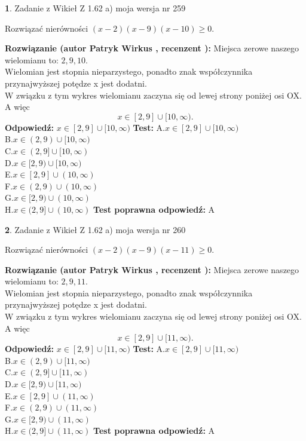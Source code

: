 \documentclass[12pt, a4paper]{article}
\theoremstyle{definition} %
\newtheorem{zad}{}
\newcommand{\zadStart}[1]{\begin{zad}#1\newline}
\newcommand{\zadStop}{\end{zad}}
\newcommand{\rozwStart}[2]{\noindent \textbf{Rozwiązanie (autor #1 , recenzent #2): }\newline}
\newcommand{\rozwStop}{\newline}
\newcommand{\odpStart}{\noindent \textbf{Odpowiedź:}\newline}
\newcommand{\odpStop}{\newline}
\newcommand{\testStart}{\noindent \textbf{Test:}\newline}
\newcommand{\testStop}{\newline}
\newcommand{\kluczStart}{\noindent \textbf{Test poprawna odpowiedź:}\newline}
\newcommand{\kluczStop}{\newline}
\begin{document}
\zadStart{Zadanie z Wikieł Z 1.62 a) moja wersja nr 259}

Rozwiązać nierówności $(x-2)(x-9)(x-10)\ge0$.
\zadStop
\rozwStart{Patryk Wirkus}{}
Miejsca zerowe naszego wielomianu to: $2, 9, 10$.\\
Wielomian jest stopnia nieparzystego, ponadto znak współczynnika przy\linebreak najwyższej potędze x jest dodatni.\\ W związku z tym wykres wielomianu zaczyna się od lewej strony poniżej osi OX. A więc $$x \in [2,9] \cup [10,\infty).$$
\rozwStop
\odpStart
$x \in [2,9] \cup [10,\infty)$
\odpStop
\testStart
A.$x \in [2,9] \cup [10,\infty)$\\
B.$x \in (2,9) \cup [10,\infty)$\\
C.$x \in (2,9] \cup [10,\infty)$\\
D.$x \in [2,9) \cup [10,\infty)$\\
E.$x \in [2,9] \cup (10,\infty)$\\
F.$x \in (2,9) \cup (10,\infty)$\\
G.$x \in [2,9) \cup (10,\infty)$\\
H.$x \in (2,9] \cup (10,\infty)$
\testStop
\kluczStart
A
\kluczStop



\zadStart{Zadanie z Wikieł Z 1.62 a) moja wersja nr 260}

Rozwiązać nierówności $(x-2)(x-9)(x-11)\ge0$.
\zadStop
\rozwStart{Patryk Wirkus}{}
Miejsca zerowe naszego wielomianu to: $2, 9, 11$.\\
Wielomian jest stopnia nieparzystego, ponadto znak współczynnika przy\linebreak najwyższej potędze x jest dodatni.\\ W związku z tym wykres wielomianu zaczyna się od lewej strony poniżej osi OX. A więc $$x \in [2,9] \cup [11,\infty).$$
\rozwStop
\odpStart
$x \in [2,9] \cup [11,\infty)$
\odpStop
\testStart
A.$x \in [2,9] \cup [11,\infty)$\\
B.$x \in (2,9) \cup [11,\infty)$\\
C.$x \in (2,9] \cup [11,\infty)$\\
D.$x \in [2,9) \cup [11,\infty)$\\
E.$x \in [2,9] \cup (11,\infty)$\\
F.$x \in (2,9) \cup (11,\infty)$\\
G.$x \in [2,9) \cup (11,\infty)$\\
H.$x \in (2,9] \cup (11,\infty)$
\testStop
\kluczStart
A
\kluczStop
\end{document}
